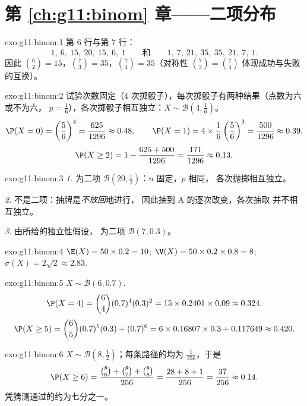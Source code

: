 \section*{第 \ref{ch:g11:binom} 章——二项分布}

\begin{solution}{exo:g11:binom:1}
第 $6$ 行与第 $7$ 行：
\[
1,\ 6,\ 15,\ 20,\ 15,\ 6,\ 1
\qquad\text{和}\qquad
1,\ 7,\ 21,\ 35,\ 35,\ 21,\ 7,\ 1 .
\]
因此 $\binom62 = 15$，$\binom73 = 35$，$\binom74 = 35$（对称性
$\binom73 = \binom74$ 体现成功与失败的互换）。
\end{solution}

\begin{solution}{exo:g11:binom:2}
试验次数固定（$4$ 次掷骰子），每次掷骰子有两种结果（点数为六或不为六，
$p = \frac16$），各次掷骰子相互独立：$X \sim \mathcal B(4, \frac16)$。
\[
\P(X=0) = \left(\frac56\right)^4 = \frac{625}{1296} \approx 0.48,
\qquad
\P(X=1) = 4 \times \frac16\left(\frac56\right)^3 = \frac{500}{1296}
\approx 0.39,
\]
\[
\P(X \geq 2) = 1 - \frac{625 + 500}{1296} = \frac{171}{1296}
\approx 0.13 .
\]
\end{solution}

\begin{solution}{exo:g11:binom:3}
\emph{1.} 为二项 $\mathcal B(20, \frac12)$：$n$ 固定，$p$ 相同，
各次抛掷相互独立。

\emph{2.} 不是二项：抽牌是\emph{不放回}地进行，
因此抽到 A 的逐次改变，各次抽取
并不相互独立。

\emph{3.} 由所给的独立性假设，
为二项 $\mathcal B(7, 0.3)$。
\end{solution}

\begin{solution}{exo:g11:binom:4}
$\E(X) = 50 \times 0.2 = 10$;
$\V(X) = 50 \times 0.2 \times 0.8 = 8$;
$\sigma(X) = 2\sqrt2 \approx 2.83$.
\end{solution}

\begin{solution}{exo:g11:binom:5}
$X \sim \mathcal B(6, 0.7)$.
\[
\P(X = 4) = \binom64 (0.7)^4 (0.3)^2 = 15 \times 0.2401 \times 0.09
\approx 0.324 .
\]
\[
\P(X \geq 5) = \binom65 (0.7)^5(0.3) + (0.7)^6
= 6 \times 0.16807 \times 0.3 + 0.117649 \approx 0.420 .
\]
\end{solution}

\begin{solution}{exo:g11:binom:6}
$X \sim \mathcal B\left(8, \frac12\right)$；每条路径的均为
$\frac{1}{256}$，于是
\[
\P(X \geq 6) = \frac{\binom86 + \binom87 + \binom88}{256}
= \frac{28 + 8 + 1}{256} = \frac{37}{256} \approx 0.14 .
\]
凭猜测通过的约为七分之一。
\end{solution}

